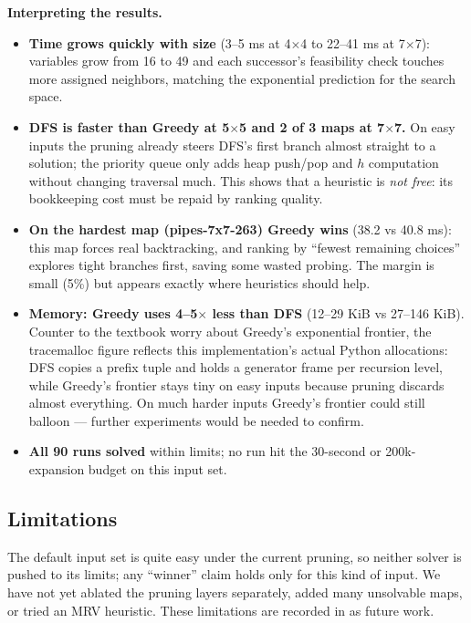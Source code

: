 \textbf{Interpreting the results.}

\begin{itemize}
\item \textbf{Time grows quickly with size} (3--5 ms at 4$\times$4 to 22--41 ms
at 7$\times$7): variables grow from 16 to 49 and each successor's feasibility
check touches more assigned neighbors, matching the exponential prediction for
the search space.
\item \textbf{DFS is faster than Greedy at 5$\times$5 and 2 of 3 maps at
7$\times$7.} On easy inputs the pruning already steers DFS's first branch almost
straight to a solution; the priority queue only adds heap push/pop and $h$
computation without changing traversal much. This shows that a heuristic is
\emph{not free}: its bookkeeping cost must be repaid by ranking quality.
\item \textbf{On the hardest map (pipes-7x7-263) Greedy wins} (38.2 vs 40.8 ms):
this map forces real backtracking, and ranking by ``fewest remaining choices''
explores tight branches first, saving some wasted probing. The margin is small
(5\%) but appears exactly where heuristics should help.
\item \textbf{Memory: Greedy uses 4--5$\times$ less than DFS} (12--29 KiB vs
27--146 KiB). Counter to the textbook worry about Greedy's exponential frontier,
the tracemalloc figure reflects this implementation's actual Python allocations:
DFS copies a prefix tuple and holds a generator frame per recursion level, while
Greedy's frontier stays tiny on easy inputs because pruning discards almost
everything. On much harder inputs Greedy's frontier could still balloon ---
further experiments would be needed to confirm.
\item \textbf{All 90 runs solved} within limits; no run hit the 30-second or
200k-expansion budget on this input set.
\end{itemize}

\subsection{Limitations}

The default input set is quite easy under the current pruning, so neither solver
is pushed to its limits; any ``winner'' claim holds only for this kind of input.
We have not yet ablated the pruning layers separately, added many unsolvable
maps, or tried an MRV heuristic. These limitations are recorded in
 as future work.
